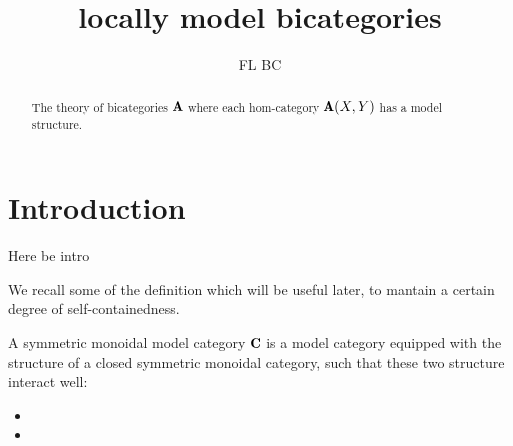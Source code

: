 \documentclass[a4paper,12pt]{amsart}
\title{locally model bicategories}
\author{FL BC}
\begin{document}
\begin{abstract}
The theory of bicategories $\A$ where each hom-category $\A(X,Y)$ has a model structure.
\end{abstract}
\maketitle
\def\Prof{\cate{Prof}}
\section*{Introduction}
Here be intro

We recall some of the definition which will be useful later, to mantain a certain degree of self-containedness.
\begin{definition}

\end{definition}
\begin{definition}
A symmetric monoidal model category $\C$ is a model category equipped with the structure of a closed symmetric monoidal category, such that these two structure interact well:
\begin{itemize}
\item 
\item 
\end{itemize}
\end{definition}
\begin{definition}

\end{definition}
\begin{definition}

\end{definition}
\end{document}
